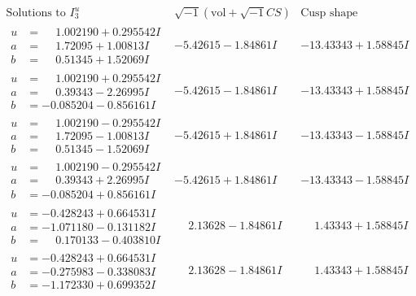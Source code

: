 \documentclass[1p]{elsarticle_modified}
\theoremstyle{definition}
\newcommand{\I}{\sqrt{-1}}
\begin{document}
$$\begin{array}{c|c|c}  
\text{Solutions to }I^u_{3}& \I (\text{vol} + \sqrt{-1}CS) & \text{Cusp shape}\\
 \hline 
\begin{aligned}
u &= \phantom{-}1.002190 + 0.295542 I \\
a &= \phantom{-}1.72095 + 1.00813 I \\
b &= \phantom{-}0.51345 + 1.52069 I\end{aligned}
 & -5.42615 - 1.84861 I & -13.43343 + 1.58845 I \\ \hline\begin{aligned}
u &= \phantom{-}1.002190 + 0.295542 I \\
a &= \phantom{-}0.39343 - 2.26995 I \\
b &= -0.085204 - 0.856161 I\end{aligned}
 & -5.42615 - 1.84861 I & -13.43343 + 1.58845 I \\ \hline\begin{aligned}
u &= \phantom{-}1.002190 - 0.295542 I \\
a &= \phantom{-}1.72095 - 1.00813 I \\
b &= \phantom{-}0.51345 - 1.52069 I\end{aligned}
 & -5.42615 + 1.84861 I & -13.43343 - 1.58845 I \\ \hline\begin{aligned}
u &= \phantom{-}1.002190 - 0.295542 I \\
a &= \phantom{-}0.39343 + 2.26995 I \\
b &= -0.085204 + 0.856161 I\end{aligned}
 & -5.42615 + 1.84861 I & -13.43343 - 1.58845 I \\ \hline\begin{aligned}
u &= -0.428243 + 0.664531 I \\
a &= -1.071180 - 0.131182 I \\
b &= \phantom{-}0.170133 - 0.403810 I\end{aligned}
 & \phantom{-}2.13628 - 1.84861 I & \phantom{-}1.43343 + 1.58845 I \\ \hline\begin{aligned}
u &= -0.428243 + 0.664531 I \\
a &= -0.275983 - 0.338083 I \\
b &= -1.172330 + 0.699352 I\end{aligned}
 & \phantom{-}2.13628 - 1.84861 I & \phantom{-}1.43343 + 1.58845 I \\ \hline\begin{aligned}

\end{aligned}
\end{array}$$
\end{document}
